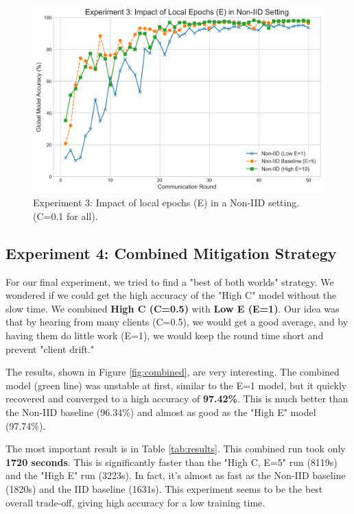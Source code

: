 \documentclass[conference]{IEEEtran}
\begin{document}
\begin{figure}[htbp]
  \centering
  \includegraphics[width=0.9\linewidth]{fig_3_impact_of_E.png}
  \caption{Experiment 3: Impact of local epochs (E) in a Non-IID setting. (C=0.1 for all).}
  \label{fig:impact_e}
\end{figure}

\subsection{Experiment 4: Combined Mitigation Strategy}
For our final experiment, we tried to find a "best of both worlds" strategy. We wondered if we could get the high accuracy of the "High C" model without the slow time. We combined \textbf{High C (C=0.5)} with \textbf{Low E (E=1)}. Our idea was that by hearing from many clients (C=0.5), we would get a good average, and by having them do little work (E=1), we would keep the round time short and prevent "client drift."

The results, shown in Figure \ref{fig:combined}, are very interesting. The combined model (green line) was unstable at first, similar to the E=1 model, but it quickly recovered and converged to a high accuracy of \textbf{97.42\%}. This is much better than the Non-IID baseline (96.34\%) and almost as good as the "High E" model (97.74\%).

The most important result is in Table \ref{tab:results}. This combined run took only \textbf{1720 seconds}. This is significantly faster than the "High C, E=5" run (8119s) and the "High E" run (3223s). In fact, it's almost as fast as the Non-IID baseline (1820s) and the IID baseline (1631s). This experiment seems to be the best overall trade-off, giving high accuracy for a low training time.
\end{document}
